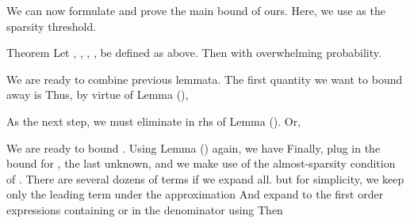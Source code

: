 \startsection [title={The Main Bound}]

We can now formulate and prove the main bound of ours.
Here, we use  as the sparsity threshold.

\Result
{Theorem}
{
Let , , , ,  be defined as above.
Then
with overwhelming probability.
}

We are ready to combine previous lemmata.
The first quantity we want to bound away is
Thus, by virtue of Lemma (),

As the next step, we must eliminate  in rhs of Lemma ().
Or,

We are ready to bound .
Using Lemma () again, we have
Finally, plug in the bound for , the last unknown, and we make use of the almost-sparsity condition of .
There are several dozens of terms if we expand all.
but for simplicity, we keep only the leading term under the approximation
And expand to the first order expressions containing  or  in the denominator using
Then

\color[red]{(To be done)}

\stopchapter
